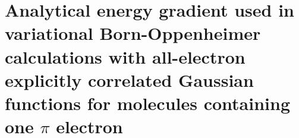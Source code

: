 \chapter{Analytical energy gradient used in variational Born-Oppenheimer calculations with all-electron explicitly correlated Gaussian functions for molecules containing one $\pi$ electron\label{apndx1}}



